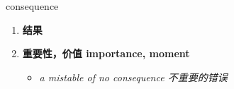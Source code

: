 
\begin{frame}
{\huge consequence}
\begin{center}
\begin{enumerate}\Large
  \item \textbf{结果}
  \item \textbf{重要性，价值 importance, moment}
  \begin{itemize}
    \item \em{\Large{a mistable of no consequence 不重要的错误}}
  \end{itemize}
\end{enumerate}
\end{center}
\end{frame}
